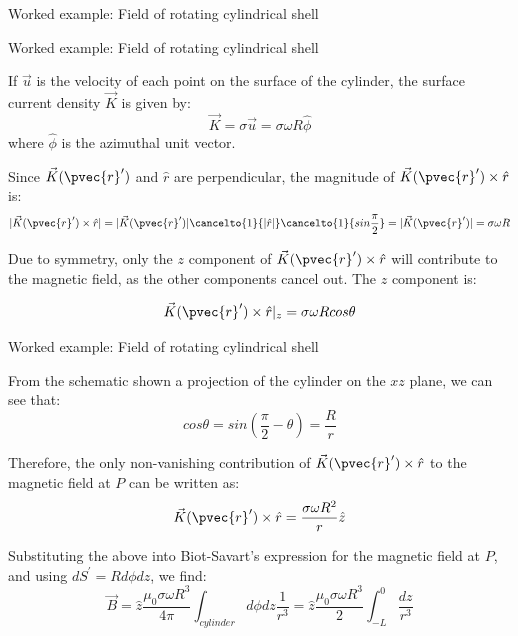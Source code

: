 {\begin{frame}{Worked example: Field of rotating cylindrical shell}
\end{frame}

%
%
%

\begin{frame}{Worked example: Field of rotating cylindrical shell}

If $\vec{u}$ is the velocity of each point on the surface of the cylinder,
the surface current density $\vec{K}$ is given by:
\begin{equation*}
  \vec{K} = \sigma \vec{u} = \sigma \omega R \hat{\phi}
\end{equation*}
where  $\hat{\phi}$ is the azimuthal unit vector.

Since $\vec{K}(\pvec{r}')$ and $\hat{r}$ are perpendicular,
the magnitude of $\vec{K}(\pvec{r}') \times \hat{r}$ is:
\begin{equation*}
  |\vec{K}(\pvec{r}') \times \hat{r}| =
    |\vec{K}(\pvec{r}')| \cancelto{1}{|\hat{r}|} \cancelto{1}{sin\frac{\pi}{2}} =
    |\vec{K}(\pvec{r}')| = \sigma \omega R
\end{equation*}

Due to symmetry, only the $z$ component of
$\vec{K}(\pvec{r}') \times \hat{r}$ will contribute to the magnetic field,
as the other components cancel out. The $z$ component is:

\begin{equation*}
  \vec{K}(\pvec{r}') \times \hat{r} \rvert_{z} =
    \sigma \omega R cos\theta
\end{equation*}

\end{frame}

%
%
%

\begin{frame}{Worked example: Field of rotating cylindrical shell}

From the schematic shown a projection of the cylinder on the $xz$ plane,
we can see that:
\begin{equation*}
  cos\theta = sin(\frac{\pi}{2}-\theta) = \frac{R}{r}
\end{equation*}

Therefore, the only non-vanishing contribution of $\vec{K}(\pvec{r}') \times \hat{r}$
to the magnetic field at $P$ can be written as:
\begin{equation*}
  \vec{K}(\pvec{r}') \times \hat{r}  =
    \frac{\sigma \omega R^2}{r} \hat{z}
\end{equation*}

Substituting the above into Biot-Savart's expression for the magnetic field
at $P$, and using $dS^\prime = R d\phi dz$, we find:
\begin{equation*}
  \vec{B} =
    \hat{z} \frac{\mu_0 \sigma \omega R^3}{4\pi}
    \int_{cylinder} d\phi dz \frac{1}{r^3}  =
    \hat{z} \frac{\mu_0 \sigma \omega R^3}{2}
    \int_{-L}^{0} \frac{dz}{r^3}
\end{equation*}


\end{frame}}
